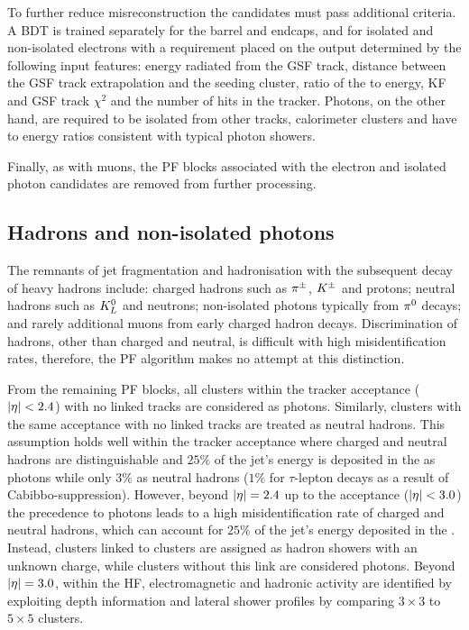 To further reduce misreconstruction the candidates must pass additional criteria. A BDT is trained separately for the barrel and endcaps, and for isolated and non-isolated electrons with a requirement placed on the output determined by the following input features: energy radiated from the GSF track, distance between the GSF track extrapolation and the \ECAL seeding cluster, ratio of the \HCAL to \ECAL energy, KF and GSF track $\chi^2$ and the number of hits in the tracker. Photons, on the other hand, are required to be isolated from other tracks, calorimeter clusters and have \HCAL to \ECAL energy ratios consistent with typical photon showers.

Finally, as with muons, the PF blocks associated with the electron and isolated photon candidates are removed from further processing.


\subsection{Hadrons and non-isolated photons}

The remnants of jet fragmentation and hadronisation with the subsequent decay of heavy hadrons include: charged hadrons such as $\pi^{\pm}$, $K^{\pm}$ and protons; neutral hadrons such as $K_L^{0}$ and neutrons; non-isolated photons typically from $\pi^{0}$ decays; and rarely additional muons from early charged hadron decays. Discrimination of hadrons, other than charged and neutral, is difficult with high misidentification rates, therefore, the PF algorithm makes no attempt at this distinction.

From the remaining PF blocks, all \ECAL clusters within the tracker acceptance (${|\eta|<2.4}$) with no linked tracks are considered as photons. Similarly, \HCAL clusters with the same acceptance with no linked tracks are treated as neutral hadrons. This assumption holds well within the tracker acceptance where charged and neutral hadrons are distinguishable and $25\%$ of the jet's energy is deposited in the \ECAL as photons while only $3\%$ as neutral hadrons ($1\%$ for $\tau$-lepton decays as a result of Cabibbo-suppression). However, beyond ${|\eta|=2.4}$ up to the \ECAL acceptance (${|\eta|<3.0}$) the precedence to photons leads to a high misidentification rate of charged and neutral hadrons, which can account for $25\%$ of the jet's energy deposited in the \ECAL. Instead, \ECAL clusters linked to \HCAL clusters are assigned as hadron showers with an unknown charge, while \ECAL clusters without this link are considered photons. Beyond ${|\eta|=3.0}$, within the HF, electromagnetic and hadronic activity are identified by exploiting depth information and lateral shower profiles by comparing $3\times 3$ to $5\times 5$ clusters.

